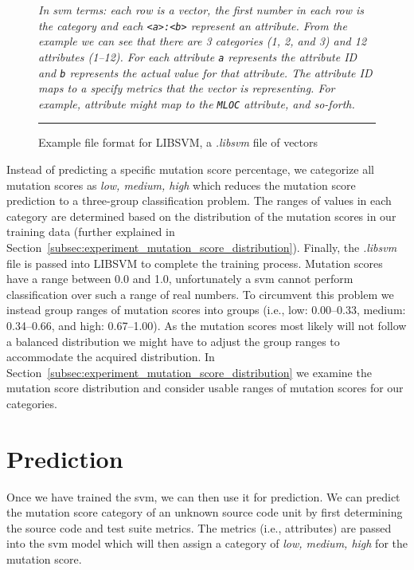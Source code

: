 \begin{figure}[t]
  \centering
  \begin{minipage}{9.5cm}
    
  \end{minipage}
  \caption{Example file format for LIBSVM, a \emph{.libsvm} file of vectors}
  \vspace{1mm}
  \footnotesize{\emph{In \gls{svm} terms: each row is a vector, the first number in each row is the category and each \texttt{<a>:<b>} represent an attribute. From the example we can see that there are 3 categories (1, 2, and 3) and 12 attributes (1--12). For each attribute \texttt{a} represents the attribute ID and \texttt{b} represents the actual value for that attribute. The attribute ID maps to a specify metrics that the vector is representing. For example, attribute  might map to the \texttt{MLOC} attribute, and so-forth.}}
  \vspace{2mm}
  \hrule
  \label{fig:libsvm_file}
\end{figure}

Instead of predicting a specific mutation score percentage, we categorize all mutation scores as \textit{low, medium, high} which reduces the mutation score prediction to a three-group classification problem. The ranges of values in each category are determined based on the distribution of the mutation scores in our training data (further explained in Section~\ref{subsec:experiment_mutation_score_distribution}). Finally, the \emph{.libsvm} file is passed into LIBSVM to complete the training process. Mutation scores have a range between 0.0 and 1.0, unfortunately a \gls{svm} cannot perform classification over such a range of real numbers. To circumvent this problem we instead group ranges of mutation scores into groups (i.e., low: 0.00--0.33, medium: 0.34--0.66, and high: 0.67--1.00). As the mutation scores most likely will not follow a balanced distribution we might have to adjust the group ranges to accommodate the acquired distribution. In Section~\ref{subsec:experiment_mutation_score_distribution} we examine the mutation score distribution and consider usable ranges of mutation scores for our categories.


\section{Prediction}
\label{sec:approach_prediction}
Once we have trained the \gls{svm}, we can then use it for prediction. We can predict the mutation score category of an unknown source code unit by first determining the source code and test suite metrics. The metrics (i.e., attributes) are passed into the \gls{svm} model which will then assign a category of \textit{low, medium, high} for the mutation score.


